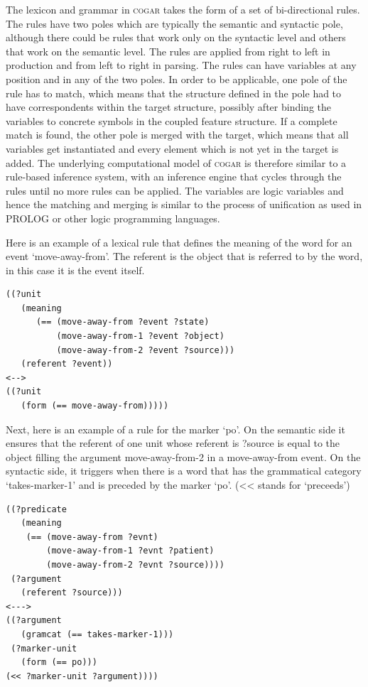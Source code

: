 The lexicon and grammar in \textsc{cogar} takes the form of a set of bi-directional rules. The rules have two poles 
which are typically the semantic and syntactic pole, although there could be rules that work only on the 
syntactic level and others that work on the semantic level. The rules are applied 
from right to left in production and from left to right in parsing. 
The rules can have variables at any position and in any of the two poles. In order to be applicable, 
one pole of the rule has to match, which means that the structure defined in the pole had to 
have correspondents within the target structure, possibly after binding the variables to concrete 
symbols in the coupled feature structure. If a complete match is 
found, the other pole is merged with the target, which means that all variables get instantiated and every 
element which is not yet in the target is added. The underlying computational model of \textsc{cogar}  
is therefore similar to a rule-based inference system, with an inference engine that cycles through the rules until 
no more rules can be applied. The variables are logic variables and hence the matching and merging is similar 
to the process of unification as used in PROLOG or other logic programming languages. 

Here is an example of a lexical rule that defines the meaning of the word for an event `move-away-from'. The referent is 
the object that is referred to by the word, in this case it is the event itself. 
\begin{verbatim}
((?unit 
   (meaning
      (== (move-away-from ?event ?state)
          (move-away-from-1 ?event ?object)
          (move-away-from-2 ?event ?source)))
   (referent ?event)) 
<-->
((?unit
   (form (== move-away-from)))))
\end{verbatim}
Next, here is an example of a rule for the marker `po'. On the semantic side it ensures that the referent of one unit 
whose referent is ?source is equal to the object filling the argument move-away-from-2 in a move-away-from event. 
On the syntactic side, it triggers when there is a word that has the grammatical category `takes-marker-1' and 
is preceded by the marker `po'. (<< stands for `preceeds') 
\begin{verbatim}
((?predicate 
   (meaning
    (== (move-away-from ?evnt)
        (move-away-from-1 ?evnt ?patient)
        (move-away-from-2 ?evnt ?source))))
 (?argument
   (referent ?source))) 
<---> 
((?argument
   (gramcat (== takes-marker-1)))
 (?marker-unit
   (form (== po))) 
(<< ?marker-unit ?argument))))
\end{verbatim}

